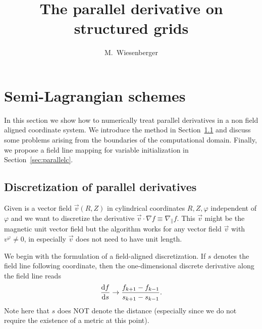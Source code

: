 






\title{The parallel derivative on structured grids}
\author{M.~Wiesenberger}
 
\maketitle
\section{Semi-Lagrangian schemes} \label{sec:parallel}
In this section we show how to numerically treat parallel derivatives in a non field
aligned coordinate system.
We introduce the method in Section~\ref{sec:parallela} %
and discuss some problems arising from the boundaries of the computational domain.
Finally, we propose a field line mapping for variable initialization in Section~\ref{sec:parallelc}.

\subsection{Discretization of parallel derivatives} \label{sec:parallela}
Given is a vector field $\vec v(R,Z)$ in cylindrical coordinates $R,Z,\varphi$ independent of $\varphi$ and we want to 
discretize the derivative $\vec v \cdot\nabla f \equiv \nabla_\parallel f$. 
This $\vec v$ might be the magnetic unit vector field but the algorithm works 
for any vector field $\vec v$ with $v^\varphi\neq 0$, in especially $\vec v$ does not need
to have unit length.

We begin with the formulation of a field-aligned discretization. If $s$ denotes the 
field line following coordinate, then the one-dimensional discrete derivative along the field line reads
\begin{align}
    \frac{\mathrm{d} f }{\mathrm{d} s} \rightarrow \frac{f_{k+1}-f_{k-1}}{s_{k+1} - s_{k-1}}.
    \label{eq:proposition}
\end{align}
Note here that $s$ does NOT denote the distance 
(especially since we do not require the existence of a metric at this point).

